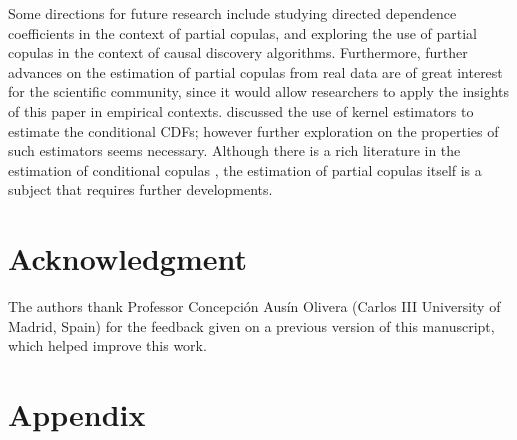 \documentclass[
]{article}
\begin{document}
Some directions for future research include studying directed dependence
coefficients \citep{azadkia2021simple, fuchs} in the context of partial
copulas, and exploring the use of partial copulas in the context of
causal discovery algorithms. Furthermore, further advances on the
estimation of partial copulas from real data are of great interest for
the scientific community, since it would allow researchers to apply the
insights of this paper in empirical contexts. \citet{bergsma2004}
discussed the use of kernel estimators to estimate the conditional CDFs;
however further exploration on the properties of such estimators seems
necessary. Although there is a rich literature in the estimation of
conditional copulas \citep[e.g.,][]{VERAVERBEKE2011, math14050914}, the
estimation of partial copulas itself is a subject that requires further
developments.

\section{Acknowledgment}\label{acknowledgment}

The authors thank Professor Concepción Ausín Olivera (Carlos III
University of Madrid, Spain) for the feedback given on a previous
version of this manuscript, which helped improve this work.

\newpage



\newpage

\section*{Appendix}\label{appendix}

\begingroup\fontsize{9}{11}\selectfont
\end{document}
